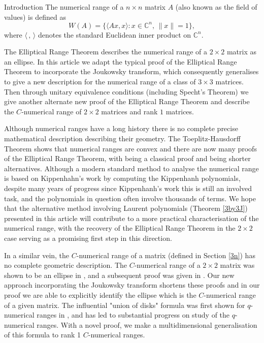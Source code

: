 \documentclass[12pt]{article}
\theoremstyle{plain}
\theoremstyle{definition}
\theoremstyle{remark}
\numberwithin{equation}{section}
\begin{document}
\begin{section}{Introduction}
The numerical range of a $n \times n$ matrix $A$ (also known as the field of values) is defined as 
    $$
    W(A) = \{ \langle Ax,x\rangle : x \in \mathbb{C}^n, \,  \|x\| = 1 \},
    $$
where $\langle\, , \, \rangle $ denotes the standard Euclidean inner product on $\mathbb{C}^n$.


The Elliptical Range Theorem describes the numerical range of a $ 2 \times 2$ matrix as an ellipse. In this article we adapt the typical proof of the Elliptical Range Theorem to incorporate the Joukowsky transform, which consequently generalises to give a new description for the numerical range of a class of $3 \times 3$ matrices. Then through unitary equivalence conditions (including Specht's Theorem) we give another alternate new proof of the Elliptical Range Theorem and describe the $C$-numerical range of $2 \times 2$ matrices and rank $1$ matrices.



    

Although numerical ranges have a long history there is no complete precise mathematical description describing their geometry. The Toeplitz-Hausdorff Theorem shows that numerical ranges are convex and there are now many proofs of the Elliptical Range Theorem, with \cite[Thm 1.3.6]{johnson1985matrix} being a classical proof and \cite{li1996simple, lakos2024short} being shorter alternatives. Although a modern standard method to analyse the numerical range is based on Kippenhahn's work \cite{kippenhahn1951wertevorrat} by computing the Kippenhanh polynomials, despite many years of progress since Kippenhanh's work this is still an involved task, and the polynomials in question often involve thousands of terms. We hope that the alternative method involving Laurent polynomials (Theorem \ref{3by3J}) presented in this article will contribute to a more practical characterisation of the numerical range, with the recovery of the Elliptical Range Theorem in the $ 2 \times 2$ case serving as a promising first step in this direction. 


In a similar vein, the $C$-numerical range of a matrix (defined in Section \ref{3n}) has no complete geometric description. The $C$-numerical range of a $2 \times 2$ matrix was shown to be an ellipse in  \cite{nakazato1994c}, and a subsequent proof was given in \cite{kwong1996some}. Our new approach incorporating the Joukowsky transform shortens these proofs and in our proof we are able to explicitly identify the ellipse which is the $C$-numerical range of a given matrix. The influential "union of disks" formula was first shown for $q$-numerical ranges in \cite{tsing1984constrained}, and has led to substantial progress on study of the $q$-numerical ranges. With a novel proof, we make a multidimensional generalisation of this formula to rank 1 $C$-numerical ranges.




\end{section}
\end{document}
